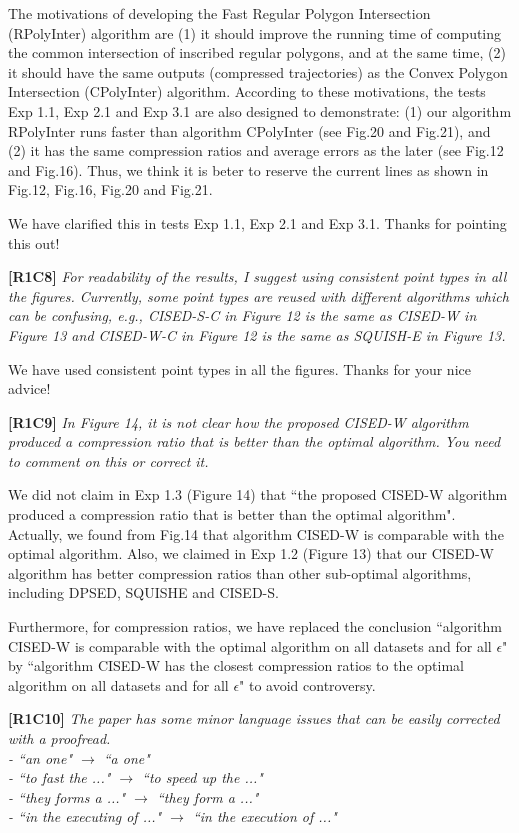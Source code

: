 \documentclass{letter}
\begin{document}
{The motivations of developing the Fast Regular Polygon Intersection (RPolyInter) algorithm are (1) it should improve the running time of computing the common intersection of inscribed regular polygons, and at the same time, (2) it should have the same outputs (compressed trajectories) as the Convex Polygon Intersection (CPolyInter) algorithm.
%
According to these motivations, the tests Exp 1.1, Exp 2.1 and Exp 3.1 are also designed to demonstrate: (1) our algorithm RPolyInter runs faster than algorithm CPolyInter (see Fig.20 and Fig.21), and (2) it has the same compression ratios and average errors as the later (see Fig.12 and Fig.16).
%
Thus, we think it is beter to reserve the current lines as shown in Fig.12, Fig.16, Fig.20 and Fig.21. %

We have clarified this in tests Exp 1.1, Exp 2.1 and Exp 3.1. Thanks for pointing this out!

\textbf{[R1C8]} \emph{For readability of the results, I suggest using consistent point types in all the figures. Currently, some point types are reused with different algorithms which can be confusing, e.g., CISED-S-C in Figure 12 is the same as CISED-W in Figure 13 and CISED-W-C in Figure 12 is the same as SQUISH-E in Figure 13.}

We have used consistent point types in all the figures. Thanks for your nice advice!

\textbf{[R1C9]} \emph{In Figure 14, it is not clear how the proposed CISED-W algorithm produced a compression ratio that is better than the optimal algorithm. You need to comment on this or correct it.}

We did not claim in Exp 1.3 (Figure 14) that ``the proposed CISED-W algorithm produced a compression ratio that is better than the optimal algorithm".
Actually, we found from Fig.14 that algorithm CISED-W is comparable with the optimal algorithm.
Also, we claimed in Exp 1.2 (Figure 13) that our CISED-W algorithm has better compression ratios than other sub-optimal algorithms, including DPSED, SQUISHE and CISED-S.

Furthermore, for compression ratios, we have replaced the conclusion ``algorithm CISED-W is comparable with the optimal algorithm on all datasets and for all $\epsilon$" by ``algorithm CISED-W has the closest compression ratios to the optimal algorithm on all datasets and for all $\epsilon$" to avoid controversy.

\textbf{[R1C10]} \emph{The paper has some minor language issues that can be easily corrected with a proofread.\\
- ``an one" $\rightarrow$ ``a one" \\
- ``to fast the ..." $\rightarrow$ ``to speed up the ..." \\
- ``they forms a ..." $\rightarrow$ ``they form a ..."	\\
- ``in the executing of ..." $\rightarrow$ ``in the execution of ..."
}


}
\end{document}
